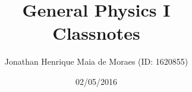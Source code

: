 \title{General Physics I \\ Classnotes}
\author{Jonathan Henrique Maia de Moraes (ID: 1620855)}
\date{02/05/2016}
\maketitle

